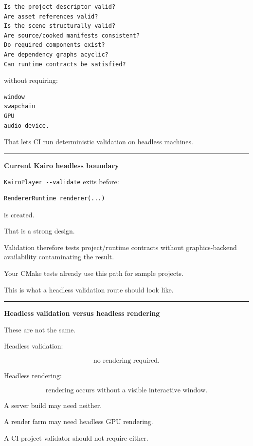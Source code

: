 \begin{verbatim}
Is the project descriptor valid?
Are asset references valid?
Is the scene structurally valid?
Are source/cooked manifests consistent?
Do required components exist?
Are dependency graphs acyclic?
Can runtime contracts be satisfied?
\end{verbatim}

without requiring:

\begin{verbatim}
window
swapchain
GPU
audio device.
\end{verbatim}

That lets CI run deterministic validation on headless machines.

\begin{center}\rule{0.5\linewidth}{0.5pt}\end{center}

\textbf{Current Kairo headless boundary}

\texttt{KairoPlayer\ -\/-validate} exits before:

\begin{verbatim}
RendererRuntime renderer(...)
\end{verbatim}

is created.

That is a strong design.

Validation therefore tests project/runtime contracts without graphics-backend availability contaminating the result.

Your CMake tests already use this path for sample projects.

This is what a headless validation route should look like.

\begin{center}\rule{0.5\linewidth}{0.5pt}\end{center}

\textbf{Headless validation versus headless rendering}

These are not the same.

Headless validation:

\[
\text{no rendering required}.
\]

Headless rendering:

\[
\text{rendering occurs without a visible interactive window}.
\]

A server build may need neither.

A render farm may need headless GPU rendering.

A CI project validator should not require either.

